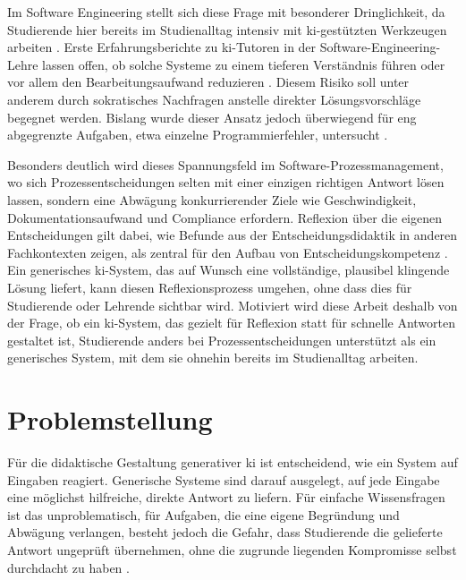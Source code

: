 Im Software Engineering stellt sich diese Frage mit besonderer Dringlichkeit, da Studierende hier
bereits im Studienalltag intensiv mit \acrshort{ki}-gestützten Werkzeugen arbeiten
\cite{sengulSoftwareEngineeringEducation2024}. Erste Erfahrungsberichte zu \acrshort{ki}-Tutoren in
der Software-Engineering-Lehre lassen offen, ob solche Systeme zu einem tieferen Verständnis führen
oder vor allem den Bearbeitungsaufwand reduzieren
\cite{frankfordAITutoringSoftwareEngineering2024, happeExperienceReportPedagogically2025}. Diesem
Risiko soll unter anderem durch sokratisches Nachfragen anstelle direkter Lösungsvorschläge begegnet
werden. Bislang wurde dieser Ansatz jedoch überwiegend für eng abgegrenzte Aufgaben, etwa einzelne
Programmierfehler, untersucht \cite{karguptaInstructNotAssist2024}.

Besonders deutlich wird dieses Spannungsfeld im
Software-Prozessmanagement, wo sich Prozessentscheidungen selten mit einer einzigen richtigen
Antwort lösen lassen, sondern eine Abwägung konkurrierender Ziele wie Geschwindigkeit,
Dokumentationsaufwand und Compliance erfordern. Reflexion über die eigenen Entscheidungen gilt dabei,
wie Befunde aus der Entscheidungsdidaktik in anderen Fachkontexten zeigen, als zentral für den Aufbau
von Entscheidungskompetenz \cite{greschEnhancingDecisionMakingSTSE2017}. Ein
generisches \acrshort{ki}-System, das auf Wunsch eine vollständige, plausibel klingende Lösung liefert,
kann diesen Reflexionsprozess umgehen, ohne dass dies für Studierende oder Lehrende sichtbar wird.
Motiviert wird diese Arbeit deshalb von der Frage, ob ein \acrshort{ki}-System, das gezielt für
Reflexion statt für schnelle Antworten gestaltet ist, Studierende anders bei
Prozessentscheidungen unterstützt als ein generisches System, mit dem sie ohnehin bereits im
Studienalltag arbeiten.

\section{Problemstellung}
\label{sec:problemstellung}

Für die didaktische Gestaltung generativer \acrshort{ki} ist entscheidend, wie ein System auf
Eingaben reagiert. Generische Systeme sind darauf ausgelegt, auf jede Eingabe eine möglichst
hilfreiche, direkte Antwort zu liefern. Für einfache Wissensfragen ist das unproblematisch, für
Aufgaben, die eine eigene Begründung und Abwägung verlangen, besteht jedoch die Gefahr, dass
Studierende die gelieferte Antwort ungeprüft übernehmen, ohne die zugrunde liegenden Kompromisse
selbst durchdacht zu haben \cite{cottonChattingCheatingEnsuring2024}.

